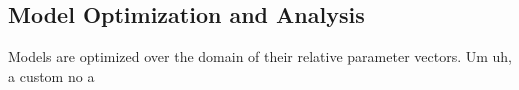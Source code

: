 \subsection{Model Optimization and Analysis}

Models are optimized over the domain of their relative parameter vectors. Um uh, a custom no a 

\subsubsection{}